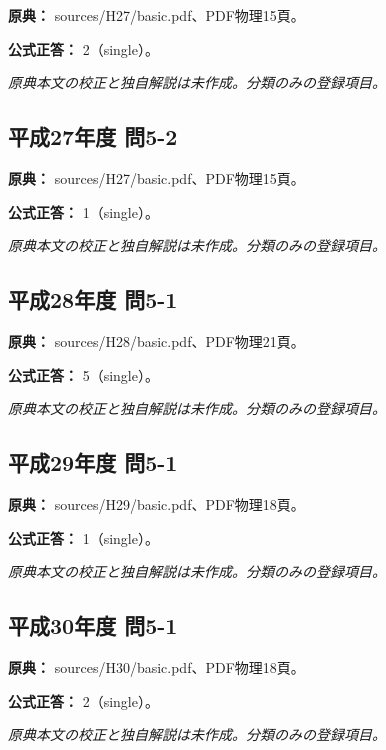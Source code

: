 \noindent\textbf{原典：} sources/H27/basic.pdf、PDF物理15頁。

\textbf{公式正答：} 2（single）。

\par\textit{原典本文の校正と独自解説は未作成。分類のみの登録項目。}

\subsection{平成27年度 問5-2}
\label{q:h27-reg-basic-5-2}

\noindent\textbf{原典：} sources/H27/basic.pdf、PDF物理15頁。

\textbf{公式正答：} 1（single）。

\par\textit{原典本文の校正と独自解説は未作成。分類のみの登録項目。}

\subsection{平成28年度 問5-1}
\label{q:h28-reg-basic-5-1}

\noindent\textbf{原典：} sources/H28/basic.pdf、PDF物理21頁。

\textbf{公式正答：} 5（single）。

\par\textit{原典本文の校正と独自解説は未作成。分類のみの登録項目。}

\subsection{平成29年度 問5-1}
\label{q:h29-reg-basic-5-1}

\noindent\textbf{原典：} sources/H29/basic.pdf、PDF物理18頁。

\textbf{公式正答：} 1（single）。

\par\textit{原典本文の校正と独自解説は未作成。分類のみの登録項目。}

\subsection{平成30年度 問5-1}
\label{q:h30-reg-basic-5-1}

\noindent\textbf{原典：} sources/H30/basic.pdf、PDF物理18頁。

\textbf{公式正答：} 2（single）。

\par\textit{原典本文の校正と独自解説は未作成。分類のみの登録項目。}

